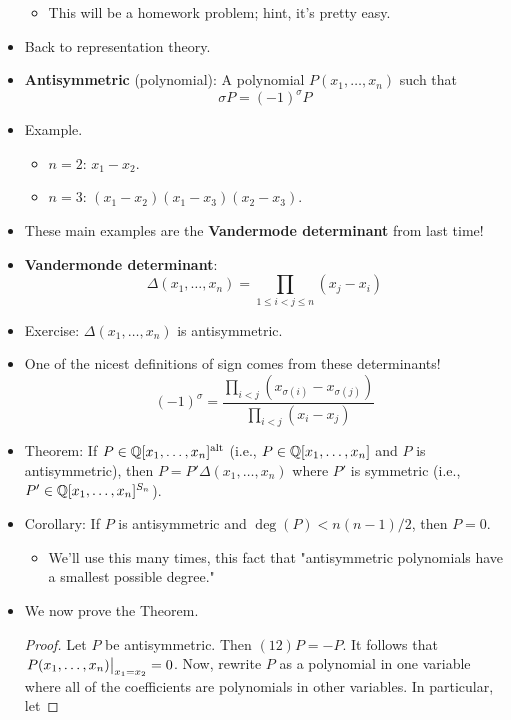 \documentclass[../notes.tex]{subfiles}
\begin{document}
\begin{itemize}
    \begin{itemize}
        \item This will be a homework problem; hint, it's pretty easy.
    \end{itemize}
    \item Back to representation theory.
    \item \textbf{Antisymmetric} (polynomial): A polynomial $P(x_1,\dots,x_n)$ such that
    \begin{equation*}
        \sigma P=(-1)^\sigma P
    \end{equation*}
    \item Example.
    \begin{itemize}
        \item $n=2$: $x_1-x_2$.
        \item $n=3$: $(x_1-x_2)(x_1-x_3)(x_2-x_3)$.
    \end{itemize}
    \item These main examples are the \textbf{Vandermode determinant} from last time!
    \item \textbf{Vandermonde determinant}:
    \begin{equation*}
        \Delta(x_1,\dots,x_n)=\prod_{1\leq i<j\leq n}(x_j-x_i)
    \end{equation*}
    \item Exercise: $\Delta(x_1,\dots,x_n)$ is antisymmetric.
    \item One of the nicest definitions of sign comes from these determinants!
    \begin{equation*}
        (-1)^\sigma = \frac{\prod_{i<j}(x_{\sigma(i)}-x_{\sigma(j)})}{\prod_{i<j}(x_i-x_j)}
    \end{equation*}
    \item Theorem: If $P\in\mathbb{Q}[x_1,\dots,x_n]^\text{alt}$ (i.e., $P\in\mathbb{Q}[x_1,\dots,x_n]$ and $P$ is antisymmetric), then $P=P'\Delta(x_1,\dots,x_n)$ where $P'$ is symmetric (i.e., $P'\in\mathbb{Q}[x_1,\dots,x_n]^{S_n}$).
    \item Corollary: If $P$ is antisymmetric and $\deg(P)<n(n-1)/2$, then $P=0$.
    \begin{itemize}
        \item We'll use this many times, this fact that "antisymmetric polynomials have a smallest possible degree."
    \end{itemize}
    \item We now prove the Theorem.
    \begin{proof}
        Let $P$ be antisymmetric. Then $(12)P=-P$. It follows that $\eval{P(x_1,\dots,x_n)}_{x_1=x_2}=0$. Now, rewrite $P$ as a polynomial in one variable where all of the coefficients are polynomials in other variables. In particular, let

\end{proof}
\end{itemize}
\end{document}
